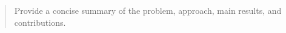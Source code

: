 \begin{abstract}
Provide a concise summary of the problem, approach, main results, and contributions.
\end{abstract}
